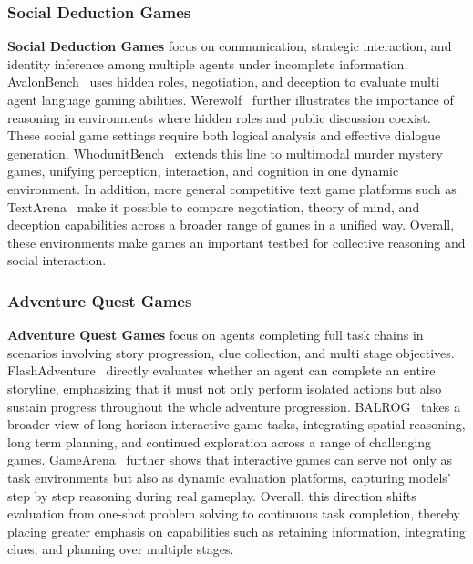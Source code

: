 \documentclass{llmxive}
\begin{document}
\subsubsection{Social Deduction Games}
\label{Social Deduction Games}
\textbf{Social Deduction Games} focus on communication, strategic interaction, and identity inference among multiple agents under incomplete information. 
AvalonBench~\cite{AvalonBench} uses hidden roles, negotiation, and deception to evaluate multi agent language gaming abilities. 
Werewolf~\cite{Werewolf} further illustrates the importance of reasoning in environments where hidden roles and public discussion coexist. These social game settings require both logical analysis and effective dialogue generation.
WhodunitBench~\cite{WhodunitBench} extends this line to multimodal murder mystery games, unifying perception, interaction, and cognition in one dynamic environment. In addition, more general competitive text game platforms such as TextArena~\cite{TextArena} make it possible to compare negotiation, theory of mind, and deception capabilities across a broader range of games in a unified way. Overall, these environments make games an important testbed for collective reasoning and social interaction.


\subsubsection{Adventure Quest Games}
\label{Adventure Quest Games}
\textbf{Adventure Quest Games} focus on agents completing full task chains in scenarios involving story progression, clue collection, and multi stage objectives. 
FlashAdventure~\cite{FlashAdventure} directly evaluates whether an agent can complete an entire storyline, emphasizing that it must not only perform isolated actions but also sustain progress throughout the whole adventure progression. BALROG~\cite{BALROG} takes a broader view of long-horizon interactive game tasks, integrating spatial reasoning, long term planning, and continued exploration across a range of challenging games. GameArena~\cite{GameArena} further shows that interactive games can serve not only as task environments but also as dynamic evaluation platforms, capturing models’ step by step reasoning during real gameplay. 
Overall, this direction shifts evaluation from one-shot problem solving to continuous task completion, thereby placing greater emphasis on capabilities such as retaining information, integrating clues, and planning over multiple stages.
\end{document}
